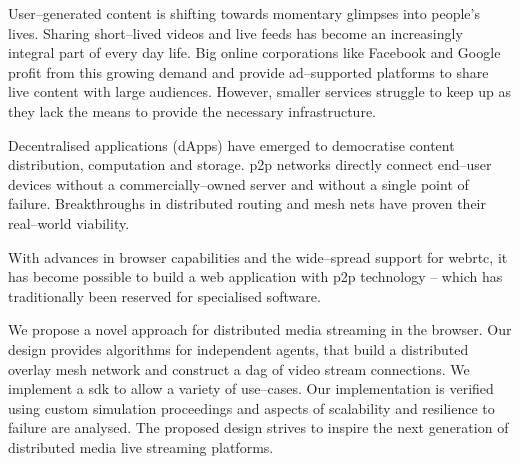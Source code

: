 User–generated content is shifting towards momentary glimpses into people's lives. Sharing short–lived videos and live feeds has become an increasingly integral part of every day life.
Big online corporations like Facebook and Google profit from this growing demand and provide ad–supported platforms to share live content with large audiences.
However, smaller services struggle to keep up as they lack the means to provide the necessary infrastructure.

Decentralised applications (dApps) have emerged to democratise content distribution, computation and storage.
\gls{p2p} networks directly connect end–user devices without a commercially–owned server and without a single point of failure. Breakthroughs in distributed routing and mesh nets have proven their real–world viability.

With advances in browser capabilities and the wide–spread support for \gls{webrtc}, it has become possible to build a web application with \gls{p2p} technology – which has traditionally been reserved for specialised software.

We propose a novel approach for distributed media streaming in the browser. Our design provides algorithms for independent agents, that build a distributed overlay mesh network and construct a \gls{dag} of video stream connections. We implement a \gls{sdk} to allow a variety of use–cases. Our implementation is verified using custom simulation proceedings and aspects of scalability and resilience to failure are analysed. The proposed design strives to inspire the next generation of distributed media live streaming platforms.
